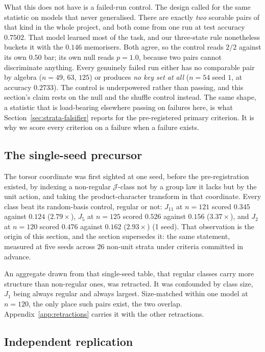 What this does not have is a failed-run control. The design called for the same statistic on
models that never generalised. There are exactly \emph{two} scorable pairs of that kind in the
whole project, and both come from one run at test accuracy $0.7502$. That model learned most
of the task, and our three-state rule nonetheless buckets it with the $0.146$ memorisers. Both agree, so the control
reads $2/2$ against its own $0.50$ bar; its own null reads $p = 1.0$, because two pairs
cannot discriminate anything. Every genuinely failed run either has no comparable pair by
algebra ($n = 49$, $63$, $125$) or produces \emph{no key set at all} ($n = 54$ seed $1$, at
accuracy $0.2733$). The control is underpowered rather than passing, and this section's claim
rests on the null and the shuffle control instead. The same shape, a statistic that is load-bearing elsewhere passing on failures here, is what
Section~\ref{sec:strata-falsifier} reports for the pre-registered primary criterion. It is
why we score every criterion on a failure when a failure exists.

\subsection{The single-seed precursor}
\label{sec:strata-c7}

The torsor coordinate was first sighted at one seed, before the pre-registration existed, by
indexing a non-regular $\mathcal{J}$-class not by a group law it lacks but by the unit action,
and taking the product-character transform in that coordinate. Every class beat its
random-basis control, regular or not: $J_{11}$ at $n = 121$ scored $0.345$ against $0.124$
($2.79\times$), $J_{5}$ at $n = 125$ scored $0.526$ against $0.156$ ($3.37\times$), and
$J_{2}$ at $n = 120$ scored $0.476$ against $0.162$ ($2.93\times$) (1 seed). That
observation is the origin of this section, and the section supersedes it: the same statement,
measured at five seeds across $26$ non-unit strata under criteria committed in advance.

An aggregate drawn from that single-seed table, that regular classes carry more structure
than non-regular ones, was retracted. It was confounded by class size, $J_{1}$ being always
regular and always largest. Size-matched within one model at $n = 120$, the only place such
pairs exist, the two overlap. Appendix~\ref{app:retractions} carries it with the other
retractions.

\subsection{Independent replication}
\label{sec:strata-engine}

